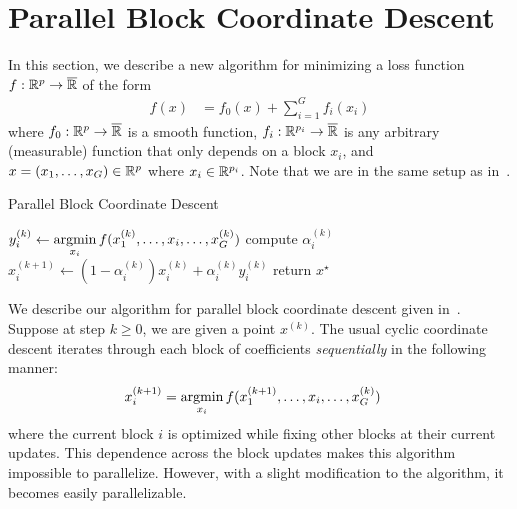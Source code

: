 \section{Parallel Block Coordinate Descent}

In this section, we describe a new algorithm for minimizing a loss function 
$f : \mathbb{R}^p \to \overline{\mathbb{R}}$ of the form
\begin{align}
    f(x)
    &=
    f_0(x)
    +
    \sum\limits_{i=1}^G f_i(x_i) 
    \label{eq:bcd:separability}
\end{align}
where $f_0 : \mathbb{R}^p \to \overline{\mathbb{R}}$ is a smooth function,
$f_i: \mathbb{R}^{p_i} \to \overline{\mathbb{R}}$ is any arbitrary (measurable) function
that only depends on a block $x_i$,
and $x = (x_1,\ldots, x_G) \in \mathbb{R}^p$ where $x_i \in \mathbb{R}^{p_i}$.
Note that we are in the same setup as in~\citet{tseng:2001}.

\begin{algorithm}[t]
    \caption{Parallel Block Coordinate Descent}\label{alg:parallel-bcd}
     {
         {
            $y_i^{(k)} \gets \operatorname*{argmin}\limits_{x_i} f(x^{(k)}_1,\ldots, x_i, \ldots, x^{(k)}_G)$\;
        }
         {
            compute $\alpha_i^{(k)}$\;
            $x_i^{(k+1)} \gets (1-\alpha_i^{(k)}) x_i^{(k)} + \alpha_i^{(k)} y_i^{(k)}$\;
        }
    }
    return $x^{\star}$\;
\end{algorithm}

We describe our algorithm for parallel block coordinate descent
given in~.
Suppose at step $k \geq 0$, we are given a point $x^{(k)}$.
The usual cyclic coordinate descent iterates through each block of coefficients 
\emph{sequentially} in the following manner:
\begin{align*}
    x_i^{(k+1)} &= \operatorname*{argmin}\limits_{x_i} f(x^{(k+1)}_1,\ldots, x_i, \ldots, x^{(k)}_G)
\end{align*}
where the current block $i$ is optimized while fixing other blocks at their current updates. 
This dependence across the block updates makes this algorithm impossible to parallelize.
However, with a slight modification to the algorithm, it becomes easily parallelizable.

